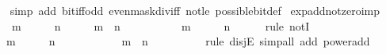 \begin{isabellebody}
%
\isadelimproof
\ \ %
\endisadelimproof
%
\isatagproof
{}\isamarkupfalse%
\ {\isacharparenleft}{\kern0pt}simp\ add{\isacharcolon}{\kern0pt}\ bit{\isacharunderscore}{\kern0pt}iff{\isacharunderscore}{\kern0pt}odd\ even{\isacharunderscore}{\kern0pt}mask{\isacharunderscore}{\kern0pt}div{\isacharunderscore}{\kern0pt}iff\ not{\isacharunderscore}{\kern0pt}le\ possible{\isacharunderscore}{\kern0pt}bit{\isacharunderscore}{\kern0pt}def{\isacharparenright}{\kern0pt}%
\endisatagproof
{\isafoldproof}%
%
\isadelimproof
\isanewline
%
\endisadelimproof
\isanewline
{}\isamarkupfalse%
\ exp{\isacharunderscore}{\kern0pt}add{\isacharunderscore}{\kern0pt}not{\isacharunderscore}{\kern0pt}zero{\isacharunderscore}{\kern0pt}imp{\isacharcolon}{\kern0pt}\isanewline
\ \ {\isacartoucheopen}{}\ {\isacharcircum}{\kern0pt}\ m\ {\isasymnoteq}\ {}{\isacartoucheclose}\ \ {\isacartoucheopen}{}\ {\isacharcircum}{\kern0pt}\ n\ {\isasymnoteq}\ {}{\isacartoucheclose}\ \ {\isacartoucheopen}{}\ {\isacharcircum}{\kern0pt}\ {\isacharparenleft}{\kern0pt}m\ {\isacharplus}{\kern0pt}\ n{\isacharparenright}{\kern0pt}\ {\isasymnoteq}\ {}{\isacartoucheclose}\isanewline
%
\isadelimproof
%
\endisadelimproof
%
\isatagproof
{}\isamarkupfalse%
\ {\isacharminus}{\kern0pt}\isanewline
\ \ \isamarkupfalse%
\ {\isacartoucheopen}{\isasymnot}\ {\isacharparenleft}{\kern0pt}{}\ {\isacharcircum}{\kern0pt}\ m\ {\isacharequal}{\kern0pt}\ {}\ {\isasymor}\ {}\ {\isacharcircum}{\kern0pt}\ n\ {\isacharequal}{\kern0pt}\ {}{\isacharparenright}{\kern0pt}{\isacartoucheclose}\isanewline
\ \ \isamarkupfalse%
\ {\isacharparenleft}{\kern0pt}rule\ notI{\isacharparenright}{\kern0pt}\isanewline
\ \ \ \ \isamarkupfalse%
\ {\isacartoucheopen}{}\ {\isacharcircum}{\kern0pt}\ m\ {\isacharequal}{\kern0pt}\ {}\ {\isasymor}\ {}\ {\isacharcircum}{\kern0pt}\ n\ {\isacharequal}{\kern0pt}\ {}{\isacartoucheclose}\isanewline
\ \ \ \ \isamarkupfalse%
\ \isamarkupfalse%
\ {\isacartoucheopen}{}\ {\isacharcircum}{\kern0pt}\ {\isacharparenleft}{\kern0pt}m\ {\isacharplus}{\kern0pt}\ n{\isacharparenright}{\kern0pt}\ {\isacharequal}{\kern0pt}\ {}{\isacartoucheclose}\isanewline
\ \ \ \ \ \ \isamarkupfalse%
\ {\isacharparenleft}{\kern0pt}rule\ disjE{\isacharparenright}{\kern0pt}\ {\isacharparenleft}{\kern0pt}simp{\isacharunderscore}{\kern0pt}all\ add{\isacharcolon}{\kern0pt}\ power{\isacharunderscore}{\kern0pt}add{\isacharparenright}{\kern0pt}\isanewline

\end{isabellebody}
